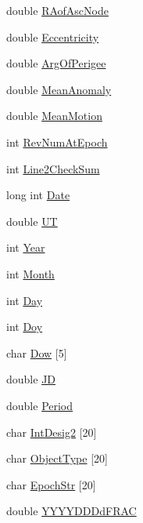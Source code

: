 \begin{CompactItemize}
\item 
double \hyperlink{struct___sgp_t_l_e_32a0bdaab6be58e1e601ee6c236c681e}{RAofAscNode}
\item 
double \hyperlink{struct___sgp_t_l_e_9e8627236231ee5feff425a382c3cc0d}{Eccentricity}
\item 
double \hyperlink{struct___sgp_t_l_e_faafa77786dcba9c30db49ee397f3bdc}{ArgOfPerigee}
\item 
double \hyperlink{struct___sgp_t_l_e_d3d6acdadbbc8715b238f8f6fbf4d4a8}{MeanAnomaly}
\item 
double \hyperlink{struct___sgp_t_l_e_a8230c8489edeb8a5e009088180c9d12}{MeanMotion}
\item 
int \hyperlink{struct___sgp_t_l_e_f19e71600e08a125e2e15bb43663cb63}{RevNumAtEpoch}
\item 
int \hyperlink{struct___sgp_t_l_e_3630c8fcee279a2fa0698fa9b7748cf3}{Line2CheckSum}
\item 
long int \hyperlink{struct___sgp_t_l_e_8c1b7b17183e48a6fafaf6302e1b1da9}{Date}
\item 
double \hyperlink{struct___sgp_t_l_e_729fdcc4d138ef63b0baba5e9af8da26}{UT}
\item 
int \hyperlink{struct___sgp_t_l_e_42e645110404fbf4f10235789577fa32}{Year}
\item 
int \hyperlink{struct___sgp_t_l_e_530b376ec91a278ac98531d3ea17f148}{Month}
\item 
int \hyperlink{struct___sgp_t_l_e_8f67164de537e3ec2b47e3204ddd3400}{Day}
\item 
int \hyperlink{struct___sgp_t_l_e_72a1d4d4121176f8cf34faa09b5b4982}{Doy}
\item 
char \hyperlink{struct___sgp_t_l_e_2837532bf73f7b76480715042d548d63}{Dow} \mbox{[}5\mbox{]}
\item 
double \hyperlink{struct___sgp_t_l_e_fca64005cd84fa9e811dac5219a618ad}{JD}
\item 
double \hyperlink{struct___sgp_t_l_e_3a64c0f7b4ac76464f9118ce94ad8f3e}{Period}
\item 
char \hyperlink{struct___sgp_t_l_e_37b8c7421d0ac1fad2e300ce2f39d03c}{IntDesig2} \mbox{[}20\mbox{]}
\item 
char \hyperlink{struct___sgp_t_l_e_70ff42494dd6b9ce04f0465a4cecc1bc}{ObjectType} \mbox{[}20\mbox{]}
\item 
char \hyperlink{struct___sgp_t_l_e_b6d6f17aac13c3765520b602f44b21be}{EpochStr} \mbox{[}20\mbox{]}
\item 
double \hyperlink{struct___sgp_t_l_e_f6a8f0b6159c1b5df5c8f6334b4002db}{YYYYDDDdFRAC}
\end{CompactItemize}


